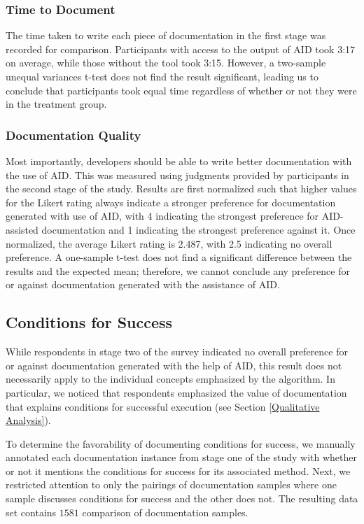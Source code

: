 \documentclass[preprint]{sigplanconf}
\begin{document}
\subsubsection{Time to Document}
The time taken to write each piece of documentation in the first stage was recorded for comparison. Participants with access to the output of AID took 3:17 on average, while those without the tool took 3:15. However, a two-sample unequal variances t-test does not find the result significant, leading us to conclude that participants took equal time regardless of whether or not they were in the treatment group.

\subsubsection{Documentation Quality}
Most importantly, developers should be able to write better documentation with the use of AID. This was measured using judgments provided by participants in the second stage of the study. Results are first normalized such that higher values for the Likert rating always indicate a stronger preference for documentation generated with use of AID, with 4 indicating the strongest preference for AID-assisted documentation and 1 indicating the strongest preference against it. Once normalized, the average Likert rating is 2.487, with 2.5 indicating no overall preference. A one-sample t-test does not find a significant difference between the results and the expected mean; therefore, we cannot conclude any preference for or against documentation generated with the assistance of AID.

\subsection{Conditions for Success}
While respondents in stage two of the survey indicated no overall preference for or against documentation generated with the help of AID, this result does not necessarily apply to the individual concepts emphasized by the algorithm. In particular, we noticed that respondents emphasized the value of documentation that explains conditions for successful execution (see Section \ref{Qualitative Analysis}).

To determine the favorability of documenting conditions for success, we manually annotated each documentation instance from stage one of the study with whether or not it mentions the conditions for success for its associated method. Next, we restricted attention to only the pairings of documentation samples where one sample discusses conditions for success and the other does not. The resulting data set contains \(1581\) comparison of documentation samples.
\end{document}
